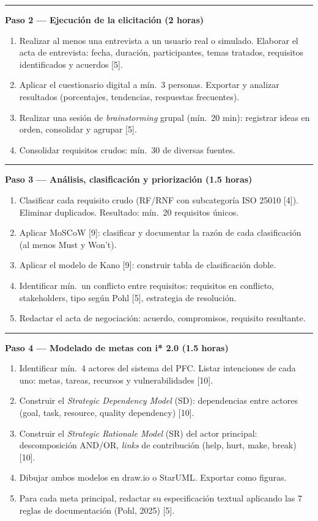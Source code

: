 \documentclass[11pt,a4paper]{article}
\newcommand{\submark}[1]{\par\vspace{4pt}\noindent
  {\color{secblue}\rule[-1pt]{3.5pt}{12pt}}\hspace{6pt}\textbf{\color{secdark}#1}\par\vspace{2pt}}
\begin{document}
\submark{Paso 2 — Ejecución de la elicitación (2 horas)}
\begin{enumerate}[label=\alph*)]
\item Realizar al menos una entrevista a un usuario real o simulado. Elaborar el acta de entrevista: fecha, duración, participantes, temas tratados, requisitos identificados y acuerdos [5].
\item Aplicar el cuestionario digital a mín.\ 3 personas. Exportar y analizar resultados (porcentajes, tendencias, respuestas frecuentes).
\item Realizar una sesión de \textit{brainstorming} grupal (mín.\ 20 min): registrar ideas en orden, consolidar y agrupar [5].
\item Consolidar requisitos crudos: mín.\ 30 de diversas fuentes.
\end{enumerate}

\submark{Paso 3 — Análisis, clasificación y priorización (1.5 horas)}
\begin{enumerate}[label=\alph*)]
\item Clasificar cada requisito crudo (RF/RNF con subcategoría ISO 25010 [4]). Eliminar duplicados. Resultado: mín.\ 20 requisitos únicos.
\item Aplicar MoSCoW [9]: clasificar y documentar la razón de cada clasificación (al menos Must y Won't).
\item Aplicar el modelo de Kano [9]: construir tabla de clasificación doble.
\item Identificar mín.\ un conflicto entre requisitos: requisitos en conflicto, stakeholders, tipo según Pohl [5], estrategia de resolución.
\item Redactar el acta de negociación: acuerdo, compromisos, requisito resultante.
\end{enumerate}

\submark{Paso 4 — Modelado de metas con i* 2.0 (1.5 horas)}
\begin{enumerate}[label=\alph*)]
\item Identificar mín.\ 4 actores del sistema del PFC. Listar intenciones de cada uno: metas, tareas, recursos y vulnerabilidades [10].
\item Construir el \textit{Strategic Dependency Model} (SD): dependencias entre actores (goal, task, resource, quality dependency) [10].
\item Construir el \textit{Strategic Rationale Model} (SR) del actor principal: descomposición AND/OR, \textit{links} de contribución (help, hurt, make, break) [10].
\item Dibujar ambos modelos en draw.io o StarUML. Exportar como figuras.
\item Para cada meta principal, redactar su especificación textual aplicando las 7 reglas de documentación (Pohl, 2025) [5].
\end{enumerate}
\end{document}
